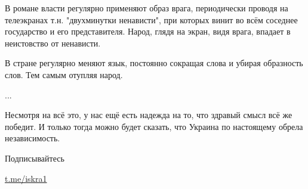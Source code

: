 В романе власти регулярно применяют образ врага, периодически проводя на
телеэкранах т.н. "двухминутки ненависти", при которых винит во всём соседнее
государство и его представителя. Народ, глядя на экран, видя врага, впадает в
неистовство от ненависти.

В стране регулярно меняют язык, постоянно сокращая слова и убирая образность
слов. Тем самым отупляя народ.

...

Несмотря на всё это, у нас ещё есть надежда на то, что здравый смысл всё же
победит. И только тогда можно будет сказать, что Украина по настоящему обрела
независимость.

Подписывайтесь

\url{t.me/iskra1}
